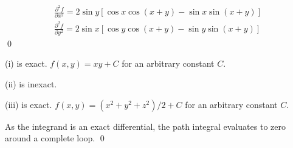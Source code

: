\documentclass[12pt]{article}
\begin{document}
\begin{equation}
    \begin{split}
        \frac{\partial^{2} f}{\partial x^{2}} = 2\sin{y} \left[ \cos{x}\cos{(x + y)} - \sin{x}\sin{(x + y)} \right] \\
        \frac{\partial^{2} f}{\partial y^{2}} = 2\sin{x} \left[ \cos{y}\cos{(x + y)} - \sin{y}\sin{(x + y)} \right]
    \end{split}
\end{equation}
\qed



(i) is exact. $f(x, y) = xy + C$ for an arbitrary constant $C$.

(ii) is inexact.

(iii) is exact. $f(x, y) = (x^{2} + y^{2} + z^{2})/2 + C$ for an arbitrary constant $C$.

As the integrand is an exact differential, the path integral evaluates to zero around a complete loop.
\qed
\end{document}
